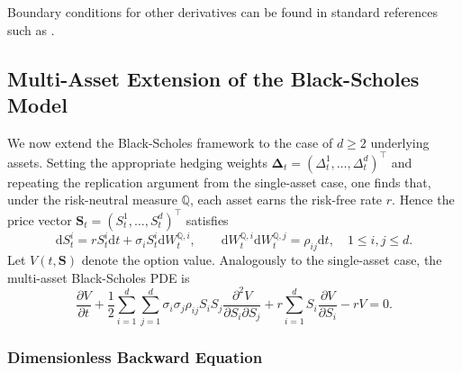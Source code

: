 \documentclass[12pt]{report} %
\theoremstyle{plain} %
\theoremstyle{definition} %
\theoremstyle{remark} %
\begin{document}
Boundary conditions for other derivatives can be found in standard references such as 
\cite{Wilmott2010PaulWO}.

\subsection{Multi-Asset Extension of the Black-Scholes Model}\label{sec:multiasset}

We now extend the Black-Scholes framework to the case of \(d\ge2\) underlying assets. Setting the
appropriate hedging weights \(\boldsymbol{\Delta}_t=(\Delta_t^{1},\dots,\Delta_t^{d})^{\top}\) and repeating the
replication argument from the single-asset case, one finds that, under the risk-neutral measure
\(\mathbb{Q}\), each asset earns the risk-free rate \(r\). Hence the price vector
\(\mathbf{S}_t=(S_t^{1},\dots,S_t^{d})^{\top}\) satisfies
\begin{equation}\label{eq:gbm_multi_redux}
 \mathrm{d}S^i_t
 = rS^i_t\mathrm{d}t
 + \sigma_i S^i_t\mathrm{d}W^{\mathbb{Q},i}_t,
 \qquad
 \mathrm{d}W^{\mathbb{Q},i}_t\mathrm{d}W^{\mathbb{Q},j}_t
 = \rho_{ij}\mathrm{d}t,
 \quad 1\le i,j\le d.
\end{equation}
Let $V(t,\mathbf{S})$ denote the option value. Analogously to the single-asset case, the multi-asset Black-Scholes PDE is
\begin{equation}\label{eq:L_multi}
 \frac{\partial V}{\partial t} + \frac12\sum_{i=1}^d\sum_{j=1}^{d}
 \sigma_i\sigma_j\rho_{ij}
	S_iS_j\frac{\partial^2 V}{\partial S_i \partial S_j}
 + r\sum_{i=1}^{d}S_i\frac{\partial V}{\partial S_i}
 - rV = 0.
\end{equation}

\subsubsection{Dimensionless Backward Equation}
\end{document}

